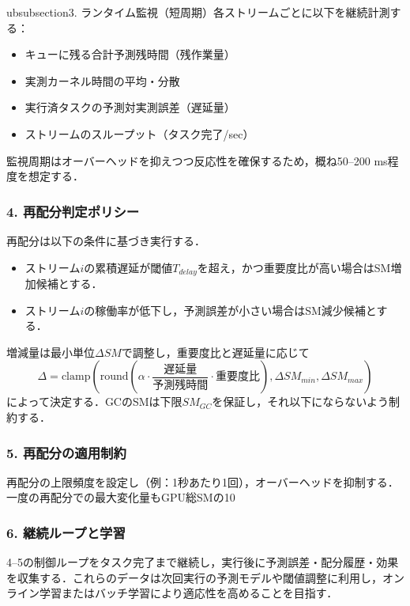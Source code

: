 ubsubsection{3. ランタイム監視（短周期）}各ストリームごとに以下を継続計測する：\begin{itemize}\item キューに残る合計予測残時間（残作業量）\item 実測カーネル時間の平均・分散\item 実行済タスクの予測対実測誤差（遅延量）\item ストリームのスループット（タスク完了/sec）\end{itemize}監視周期はオーバーヘッドを抑えつつ反応性を確保するため，概ね50–200 ms程度を想定する．\subsubsection{4. 再配分判定ポリシー}再配分は以下の条件に基づき実行する．\begin{itemize}\item ストリーム$i$の累積遅延が閾値$T_{delay}$を超え，かつ重要度比が高い場合はSM増加候補とする．\item ストリーム$i$の稼働率が低下し，予測誤差が小さい場合はSM減少候補とする．\end{itemize}増減量は最小単位$\Delta SM$で調整し，重要度比と遅延量に応じて\begin{equation*}\Delta = \mathrm{clamp}\left(\mathrm{round}\left(\alpha \cdot \frac{遅延量}{予測残時間} \cdot 重要度比\right),\Delta SM_{min},\Delta SM_{max}\right)\end{equation*}によって決定する．GCのSMは下限$SM_{GC}$を保証し，それ以下にならないよう制約する．\subsubsection{5. 再配分の適用制約}再配分の上限頻度を設定し（例：1秒あたり1回），オーバーヘッドを抑制する．一度の再配分での最大変化量もGPU総SMの10%

\subsubsection{6. 継続ループと学習}4–5の制御ループをタスク完了まで継続し，実行後に予測誤差・配分履歴・効果を収集する．これらのデータは次回実行の予測モデルや閾値調整に利用し，オンライン学習またはバッチ学習により適応性を高めることを目指す．

